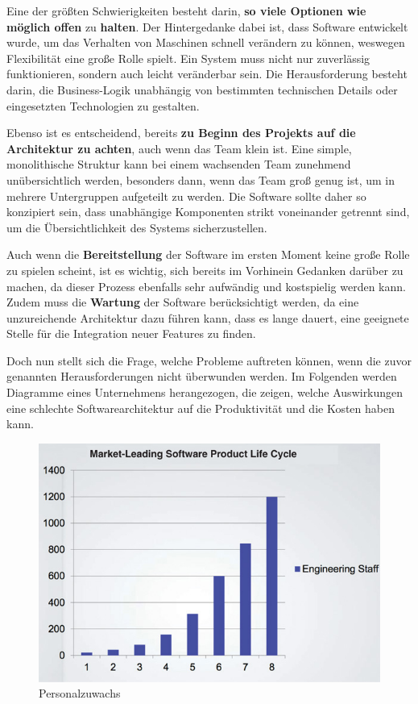 Eine der größten Schwierigkeiten besteht darin, \textbf{so viele Optionen wie möglich offen} zu \textbf{halten}.
Der Hintergedanke dabei ist, dass Software entwickelt wurde, um das Verhalten von Maschinen schnell verändern zu können, weswegen Flexibilität eine große Rolle spielt. Ein System muss nicht nur zuverlässig funktionieren, sondern auch leicht veränderbar sein.
Die Herausforderung besteht darin, die Business-Logik unabhängig von bestimmten technischen Details oder eingesetzten Technologien zu gestalten.

Ebenso ist es entscheidend, bereits \textbf{zu Beginn des Projekts auf die Architektur zu achten}, auch wenn das Team klein ist. Eine simple, monolithische Struktur kann bei einem wachsenden Team zunehmend unübersichtlich werden, besonders dann, wenn das Team groß genug ist, um in mehrere Untergruppen aufgeteilt zu werden. Die Software sollte daher so konzipiert sein, dass unabhängige Komponenten strikt voneinander getrennt sind, um die Übersichtlichkeit des Systems sicherzustellen.

Auch wenn die \textbf{Bereitstellung} der Software im ersten Moment keine große Rolle zu spielen scheint, ist es wichtig, sich bereits im Vorhinein Gedanken darüber zu machen, da dieser Prozess ebenfalls sehr aufwändig und kostspielig werden kann. \\
Zudem muss die \textbf{Wartung} der Software berücksichtigt werden, da eine unzureichende Architektur dazu führen kann, dass es lange dauert, eine geeignete Stelle für die Integration neuer Features zu finden. 
\cite[S. 136-141]{EA:Book01}

Doch nun stellt sich die Frage, welche Probleme auftreten können, wenn die zuvor genannten Herausforderungen nicht überwunden werden. Im Folgenden werden Diagramme eines Unternehmens herangezogen, die zeigen, welche Auswirkungen eine schlechte Softwarearchitektur auf die Produktivität und die Kosten haben kann. \\

\begin{figure}[H]
    \centering
    \includegraphics[width=0.8\linewidth]{images/EA/diagram_growth_of_staff.jpg}
    \caption{Personalzuwachs \\ \cite[S. 5]{EA:Book01}}
    \label{fig:personnel-growth}
\end{figure}

